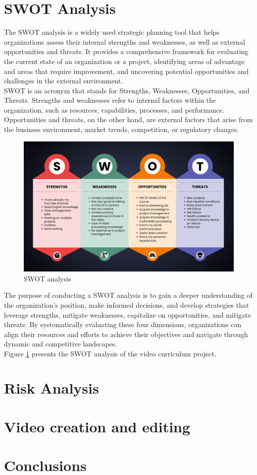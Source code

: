 \documentclass[eng]{class}
\begin{document}
\section{SWOT Analysis}
The SWOT analysis is a widely used strategic planning tool that helps organizations assess their internal strengths and weaknesses,
as well as external opportunities and threats. It provides a comprehensive framework for evaluating the current state of an organization or a project,
identifying areas of advantage and areas that require improvement, and uncovering potential opportunities and challenges in the external environment.\\
SWOT is an acronym that stands for Strengths, Weaknesses, Opportunities, and Threats. Strengths and weaknesses refer to internal factors within the organization,
such as resources, capabilities, processes, and performance. Opportunities and threats, on the other hand, are external factors that arise from the
business environment, market trends, competition, or regulatory changes.\\
\clearpage
\begin{figure}[b!]
  \centering
  \includegraphics[width=\textwidth]{images/SWOT.png}
  \caption{SWOT analysis}
  \label{fig-3}
\end{figure}
The purpose of conducting a SWOT analysis is to gain a deeper understanding of the organization's position,
make informed decisions, and develop strategies that leverage strengths, mitigate weaknesses, capitalize on opportunities,
and mitigate threats. By systematically evaluating these four dimensions, organizations can align their resources and efforts to achieve their
objectives and navigate through dynamic and competitive landscapes.\\
Figure \ref{fig-3} presents the SWOT analysis of the video curriculum project.

\section{Risk Analysis}
\section{Video creation and editing}

\section{Conclusions}

\pagestyle{OtherPage}
\end{document}
